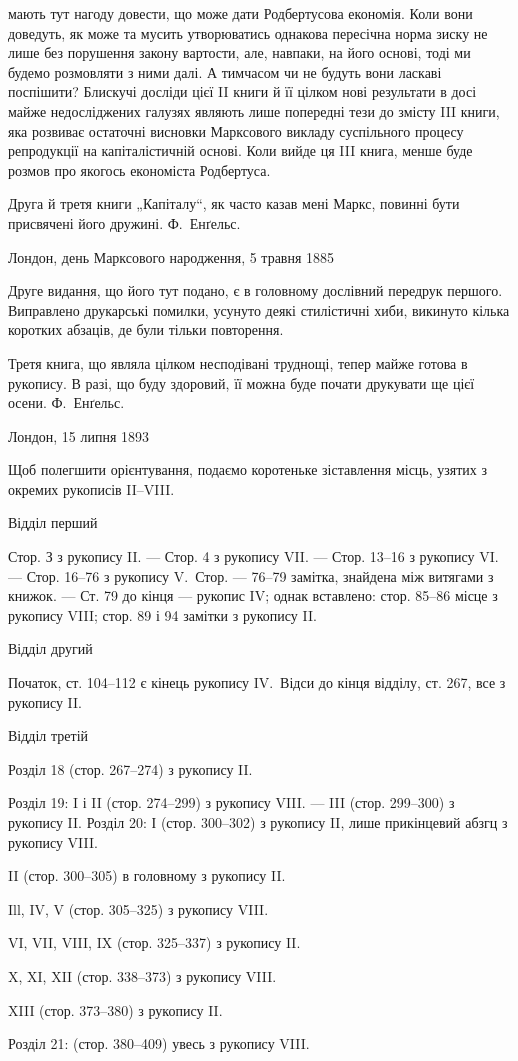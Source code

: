 \parcont{}  %
мають тут нагоду довести, що може дати Родбертусова економія. Коли
вони доведуть, як може та мусить утворюватись однакова пересічна
норма зиску не лише без порушення закону вартости, але, навпаки, на
його основі, тоді ми будемо розмовляти з ними далі. А тимчасом чи не
будуть вони ласкаві поспішити? Блискучі досліди цієї II книги й її цілком
нові результати в досі майже недосліджених галузях являють лише
попередні тези до змісту III книги, яка розвиває остаточні висновки Марксового
викладу суспільного процесу репродукції на капіталістичній
основі. Коли вийде ця III книга, менше буде розмов про якогось економіста
Родбертуса.

Друга й третя книги „Капіталу“, як часто казав мені Маркс, повинні
бути присвячені його дружині.
Ф.~Енґельс.

Лондон, день Марксового народження, 5 травня 1885~

Друге видання, що його тут подано, є в головному дослівний передрук
першого. Виправлено друкарські помилки, усунуто деякі стилістичні
хиби, викинуто кілька коротких абзаців, де були тільки повторення.

Третя книга, що являла цілком несподівані труднощі, тепер майже
готова в рукопису. В разі, що буду здоровий, її можна буде почати
друкувати ще цієї осени. Ф.~Енґельс.

Лондон, 15 липня 1893~

Щоб полегшити орієнтування, подаємо коротеньке зіставлення місць,
узятих з окремих рукописів II--VIII.

Відділ перший

Стор. З з рукопису II. — Стор. 4 з рукопису VII. — Стор. 13--16
з рукопису VI. — Стор. 16--76 з рукопису V.~Стор. — 76--79 замітка, знайдена
між витягами з книжок. — Ст. 79 до кінця — рукопис IV; однак
вставлено: стор. 85--86 місце з рукопису VIII; стор. 89 і 94 замітки з
рукопису II.

Відділ другий

Початок, ст. 104--112 є кінець рукопису IV.~Відси до кінця відділу,
ст. 267, все з рукопису II.

Відділ третій

Розділ 18 (стор. 267--274) з рукопису II.

Розділ 19: I і II (стор. 274--299) з рукопису VIII. — III (стор. 299--300)
з рукопису II.
Розділ 20: І (стор. 300--302) з рукопису II, лише прикінцевий
абзгц з рукопису VIII.

II (стор. 300--305) в головному з рукопису II.

Ill, IV, V (стор. 305--325) з рукопису VIII.

VI, VII, VIII, IX (стор. 325--337) з рукопису II.

X, XI, XII (стор. 338--373) з рукопису VIII.

XIII (стор. 373--380) з рукопису II.

Розділ 21: (стор. 380--409) увесь з рукопису VIII.
\parbreak{}  %
